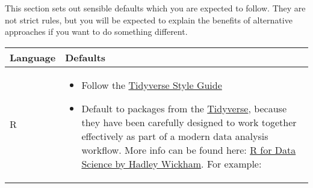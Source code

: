 \documentclass[]{book}
\providecommand{\tightlist}{%
  \setlength{\itemsep}{0pt}\setlength{\parskip}{0pt}}
\begin{document}
This section sets out sensible defaults which you are expected to follow. They are not strict rules, but you will be expected to explain the benefits of alternative approaches if you want to do something different.

\begin{longtable}[]{@{}ll@{}}
\toprule
\begin{minipage}[b]{0.27\columnwidth}\raggedright
Language\strut
\end{minipage} & \begin{minipage}[b]{0.67\columnwidth}\raggedright
Defaults\strut
\end{minipage}\tabularnewline
\midrule
\endhead
\begin{minipage}[t]{0.27\columnwidth}\raggedright
R\strut
\end{minipage} & \begin{minipage}[t]{0.67\columnwidth}\raggedright
\begin{itemize}
\tightlist
\item
  Follow the \href{https://style.tidyverse.org/index.html}{Tidyverse Style Guide}
\item
  Default to packages from the \href{http://tidyverse.org/}{Tidyverse}, because they have been carefully designed to work together effectively as part of a modern data analysis workflow. More info can be found here: \href{http://r4ds.had.co.nz}{R for Data Science by Hadley Wickham}. For example:


\end{itemize}
\end{minipage}
\end{longtable}
\end{document}
